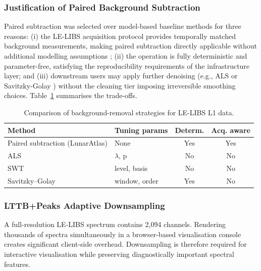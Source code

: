 \documentclass[final,5p,twocolumn,a4paper]{elsarticle}
\begin{document}
\subsubsection{Justification of Paired Background Subtraction}
Paired subtraction was selected over model-based baseline methods for three reasons: (i) the LE-LIBS acquisition protocol provides temporally matched background measurements, making paired subtraction directly applicable without additional modelling assumptions \cite{sridhar2024libs}; (ii) the operation is fully deterministic and parameter-free, satisfying the reproducibility requirements of the infrastructure layer; and (iii) downstream users may apply further denoising (e.g., ALS \cite{eilers2003perfect} or Savitzky-Golay \cite{savitzky1964}) without the cleaning tier imposing irreversible smoothing choices. Table~\ref{table:subtraction_tradeoffs} summarises the trade-offs.

\begin{table}[!htbp]
\centering
\footnotesize
\setlength{\tabcolsep}{4pt}
\begin{tabular}{@{}lp{1.6cm}cc@{}}
\toprule
\textbf{Method} & \textbf{Tuning params} & \textbf{Determ.} & \textbf{Acq. aware} \\
\midrule
Paired subtraction (LunarAtlas) & None & Yes & Yes \\
ALS \cite{eilers2003perfect} & $\lambda$, p & No & No \\
SWT \cite{nason1995stationary} & level, basis & No & No \\
Savitzky--Golay \cite{savitzky1964} & window, order & Yes & No \\
\bottomrule
\end{tabular}
\caption{Comparison of background-removal strategies for LE-LIBS L1 data.}
\label{table:subtraction_tradeoffs}
\end{table}

\subsubsection{LTTB+Peaks Adaptive Downsampling}
A full-resolution LE-LIBS spectrum contains 2,094 channels. Rendering thousands of spectra simultaneously in a browser-based visualisation console creates significant client-side overhead. Downsampling is therefore required for interactive visualisation while preserving diagnostically important spectral features.
\end{document}
